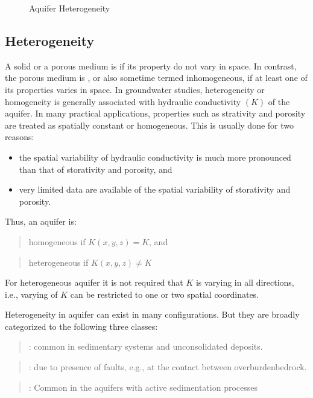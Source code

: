 \documentclass[letterpaper,10pt,english]{sphinxmanual}
\begin{document}
\begin{figure}[htbp]
\centering
\capstart

\noindent{}
\caption{Aquifer Heterogeneity}\label{\detokenize{contents/flow/lecture_05/15_het_iso:aquifer-het}}\end{figure}


\subsection{Heterogeneity}
\label{\detokenize{contents/flow/lecture_05/15_het_iso:heterogeneity}}
A solid or a porous medium is  if its property do not vary in space. In contrast, the porous medium is , or also sometime termed inhomogeneous, if at least one of its properties varies in space. In groundwater studies, heterogeneity or homogeneity is generally associated with hydraulic conductivity \((K)\) of the aquifer. In many practical applications, properties such as strativity and porosity are treated as spatially constant or homogeneous. This is usually done for two reasons:
\begin{itemize}
\item {} 
the spatial variability of hydraulic conductivity is much more pronounced than that of storativity and porosity, and

\item {} 
very limited data are available of the spatial variability of storativity and porosity.

\end{itemize}

Thus, an aquifer is:
\begin{quote}

homogeneous if \(K (x, y, z) = K\), and
\end{quote}
\begin{quote}

heterogeneous if \(K (x, y, z) \neq K\)
\end{quote}

For heterogeneous aquifer it is not required that \(K\) is varying in all directions, i.e., varying of \(K\) can be restricted to one or two spatial coordinates.

Heterogeneity in aquifer can exist in many configurations. But they are broadly categorized to the following three classes:
\begin{quote}

: common in sedimentary systems and unconsolidated deposits.
\end{quote}
\begin{quote}

: due to presence of faults, e.g., at the contact between overburden\sphinxhyphen{}bedrock.
\end{quote}
\begin{quote}

: Common in the aquifers with active sedimentation processes
\end{quote}
\end{document}
